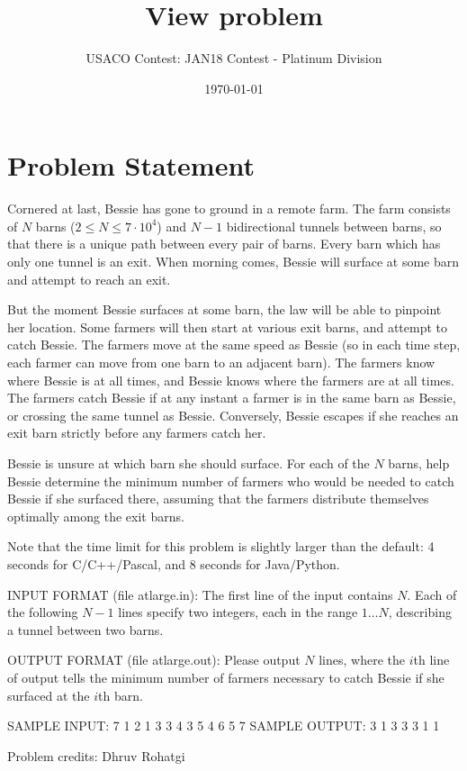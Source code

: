 \documentclass[12pt]{article}
\title{View problem}
\author{USACO Contest: JAN18 Contest - Platinum Division}
\date{\today}
\begin{document}
\maketitle

\section*{Problem Statement}

Cornered at last, Bessie has gone to ground in a remote farm. The farm consists
of $N$ barns ($2 \leq N \leq 7 \cdot 10^4$) and $N-1$ bidirectional tunnels
between barns, so that there is a unique path between every pair of barns. Every
barn which has only one tunnel is an exit. When morning comes, Bessie will
surface at some barn and attempt to reach an exit.

But the moment Bessie surfaces at some barn, the law will be able to pinpoint
her location. Some farmers will then start at various exit barns, and attempt to
catch Bessie. The farmers move at the same speed as Bessie (so in each time
step, each farmer can move from one barn to an adjacent barn). The farmers know
where Bessie is at all times, and Bessie knows where the farmers are at all
times. The farmers catch Bessie if at any instant a farmer is in the same barn
as Bessie, or crossing the same tunnel as Bessie. Conversely, Bessie escapes if
she reaches an exit barn strictly before any farmers catch her.

Bessie is unsure at which barn she should surface. For each of the $N$ barns,
help Bessie determine the minimum number of farmers who would be needed to catch
Bessie if she surfaced there, assuming that the farmers distribute themselves
optimally among the exit barns.

Note that the time limit for this problem is slightly larger than the default: 4 seconds for
C/C++/Pascal, and 8 seconds for Java/Python.

INPUT FORMAT (file atlarge.in):
The first line of the input contains $N$.  Each of the following $N-1$ lines
specify two integers, each in the range $1 \ldots N$, describing a tunnel
between two barns.

OUTPUT FORMAT (file atlarge.out):
Please output $N$ lines, where the $i$th line of output tells the minimum number
of farmers necessary to catch Bessie if she surfaced at the $i$th barn.

SAMPLE INPUT:
7
1 2
1 3
3 4
3 5
4 6
5 7
SAMPLE OUTPUT: 
3
1
3
3
3
1
1


Problem credits: Dhruv Rohatgi
\end{document}
